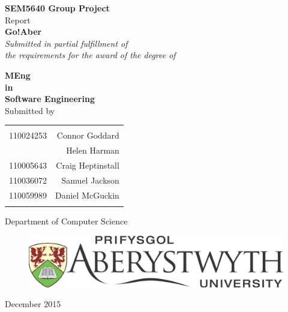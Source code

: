 \begin{titlepage}

\begin{center}

\textup{\small {\bf SEM5640 Group Project} \\ Report}\\[0.2in]

\Large \textbf {Go!Aber}\\[0.5in]

       \small \emph{Submitted in partial fulfillment of\\
        the requirements for the award of the degree of}
        \vspace{.2in}

       {\bf MEng  \\in\\ Software Engineering}\\[0.5in]

\normalsize Submitted by \\
\begin{table}[h]
\centering
\begin{tabular}{lr}\hline \\
110024253 & Connor Goddard \\
 & Helen Harman \\ 
110005643 & Craig Heptinstall \\
110036072 & Samuel Jackson \\ 
110059989 & Daniel McGuckin \\ \\ \hline 
\end{tabular}
\end{table}

\vspace{.1in}

\Large{Department of Computer Science}\\
\vspace{.4in}
\normalsize
\begin{figure}[H]
\begin{center}
\includegraphics[scale=0.2]{images/Aberystwyth_University_logo.png} 
\end{center}
\end{figure}
December 2015

\end{center}

\end{titlepage}

